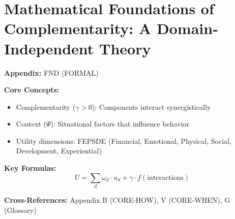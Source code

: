 
\chapter{Mathematical Foundations of Complementarity: A Domain-Independent Theory}
\label{app:formal-found}

\begin{abstract}
This appendix presents the key concepts and formalizations for Mathematical Foundations of Complementarity: A Domain-Independent Theory.
It provides theoretical foundations, practical applications, and integration
points with other components of the Evidence-Based Framework (EBF).
The content supports decision-making and behavioral analysis in the context
of complementarity and context-dependent outcomes.
\end{abstract}

\begin{tcolorbox}[colback=blue!5!white, colframe=blue!75!black,
    title=Quick Reference: Mathematical Foundations of Complementarity: A Domain-Independent Theory]

\textbf{Appendix:} FND (FORMAL)

\textbf{Core Concepts:}
\begin{itemize}[nosep]
\item Complementarity ($\gamma > 0$): Components interact synergistically
\item Context ($\Psi$): Situational factors that influence behavior
\item Utility dimensions: FEPSDE (Financial, Emotional, Physical, Social, Development, Experiential)
\end{itemize}

\textbf{Key Formulas:}
\begin{equation}
U = \sum_d \omega_d \cdot u_d + \gamma \cdot f(\text{interactions})
\end{equation}

\textbf{Cross-References:} Appendix B (CORE-HOW), V (CORE-WHEN), G (Glossary)
\end{tcolorbox}





